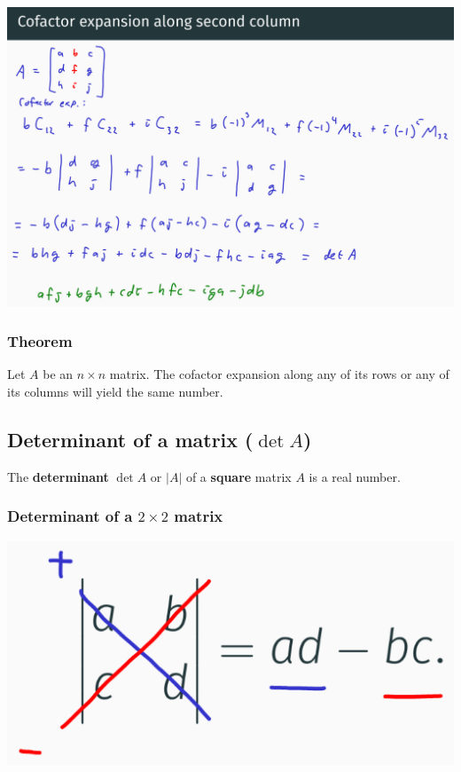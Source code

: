 \documentclass[11pt]{article}
\begin{document}
\begin{center}
\includegraphics[width=.9\linewidth]{./images/cofactor-expansion-along-the-second-column.png}
\end{center}
\subsubsection{Theorem}
\label{sec:orgea3530c}
Let \(A\) be an \(n \times n\) matrix. The cofactor expansion along any of its rows or any of its columns will yield the same number.
\subsection{Determinant of a matrix (\(\det A\))}
\label{sec:orgcc436dc}
The \textbf{determinant} \(\det A\) or \(|A|\) of a \textbf{square} matrix \(A\) is a real number.
\subsubsection{Determinant of a \(2 \times 2\) matrix}
\label{sec:org3674e64}
\begin{center}
\includegraphics[width=.9\linewidth]{./images/determinant-of-a-2-by-2-matrix.png}
\end{center}
\end{document}
